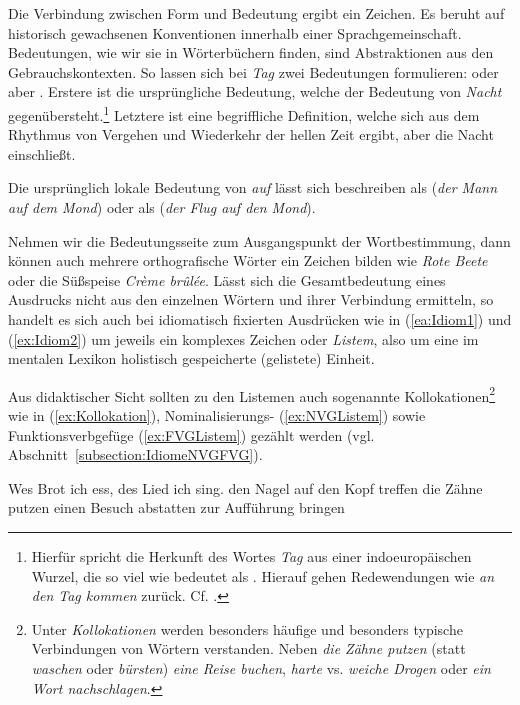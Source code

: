 Die Verbindung zwischen Form und Bedeutung ergibt ein Zeichen. Es beruht auf historisch gewachsenen Konventionen innerhalb einer Sprachgemeinschaft. Bedeutungen, wie wir sie in Wörterbüchern finden, sind Abstraktionen aus den Gebrauchskontexten. So lassen sich bei \textit{Tag} zwei Bedeutungen formulieren:  oder aber . Erstere ist die ursprüngliche Bedeutung, welche der Bedeutung von \textit{Nacht} gegenübersteht.\footnote{Hierfür spricht die Herkunft des Wortes \textit{Tag} aus einer indoeuropäischen Wurzel, die so viel wie  bedeutet als . Hierauf gehen Redewendungen wie \textit{an den Tag kommen} zurück. Cf. \citet[541]{Paul1908Woerterbuch}.} Letztere ist eine begriffliche Definition, welche sich aus dem Rhythmus von Vergehen und Wiederkehr der hellen Zeit ergibt, aber die Nacht einschließt.

Die ursprünglich lokale Bedeutung von \textit{auf} lässt sich beschreiben als  (\textit{der Mann auf dem Mond}) oder als  (\textit{der Flug auf den Mond}).

Nehmen wir die Bedeutungsseite zum Ausgangspunkt der Wortbestimmung, dann können auch mehrere orthografische Wörter ein Zeichen bilden wie \zB \textit{Rote Beete} oder die Süßspeise \textit{Crème brûlée}. Lässt sich die Gesamtbedeutung eines Ausdrucks nicht aus den einzelnen Wörtern und ihrer Verbindung ermitteln, so handelt es sich auch bei idiomatisch fixierten Ausdrücken wie in (\ref{ea:Idiom1}) und (\ref{ex:Idiom2}) um jeweils ein komplexes Zeichen oder \textit{Listem}, also um eine im mentalen Lexikon holistisch gespeicherte (gelistete) Einheit. 

Aus didaktischer Sicht sollten zu den Listemen auch sogenannte Kollokationen\footnote{Unter \textit{Kollokationen} werden besonders häufige und besonders typische Verbindungen von Wörtern verstanden. Neben \textit{die Zähne putzen} (statt \textit{waschen} oder \textit{bürsten}) \zB \textit{eine Reise buchen}, \textit{harte} vs. \textit{weiche Drogen} oder \textit{ein Wort nachschlagen}.} wie in (\ref{ex:Kollokation}), Nominalisierungs- (\ref{ex:NVGListem}) sowie Funktionsverbgefüge (\ref{ex:FVGListem}) gezählt werden (vgl. Abschnitt~\ref{subsection:IdiomeNVGFVG}).

\ea \label{ea:Listeme}
\ea \label{ea:Idiom1} Wes Brot ich ess, des Lied ich sing.
\ex \label{ex:Idiom2} den Nagel auf den Kopf treffen
\ex \label{ex:Kollokation} die Zähne putzen 
\ex \label{ex:NVGListem} einen Besuch abstatten
\ex \label{ex:FVGListem} zur Aufführung bringen
\z 
\z 

